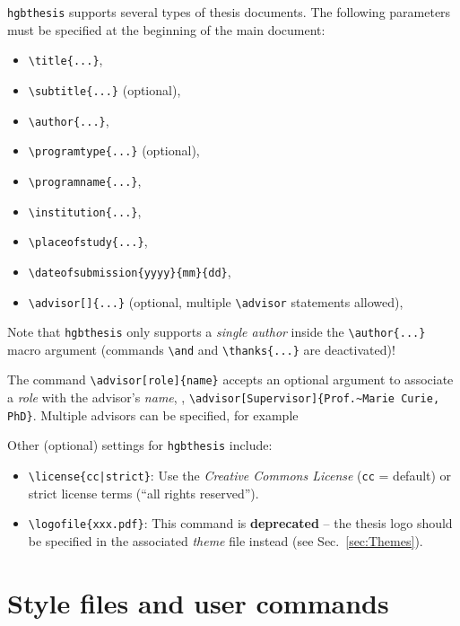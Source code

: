 \documentclass[english]{hgbarticle}
\begin{document}
\texttt{hgbthesis} supports several types of thesis documents. The following
parameters must be specified at the beginning of the main document:
%
\begin{itemize}
    \item \verb!\title{...}!,
    \item \verb!\subtitle{...}! (optional),
    \item \verb!\author{...}!,
    \item \verb!\programtype{...}! (optional), 
    \item \verb!\programname{...}!,
    \item \verb!\institution{...}!,
    \item \verb!\placeofstudy{...}!,
    \item \verb!\dateofsubmission{yyyy}{mm}{dd}!,
    \item \verb!\advisor[]{...}! (optional, multiple \verb!\advisor! statements allowed),
\end{itemize}
%
Note that \texttt{hgbthesis} only supports a \emph{single author} inside the
\verb!\author{...}! macro argument (commands \verb!\and! and
\verb!\thanks{...}! are deactivated)!

The command \verb!\advisor[role]{name}! accepts an optional argument to associate a \emph{role} 
with the advisor's \emph{name}, \eg, \verb!\advisor[Supervisor]{Prof.~Marie Curie, PhD}!.
Multiple advisors can be specified, for example
%
\begin{LaTeXCode}[numbers=none]
\end{LaTeXCode}

\noindent
Other (optional) settings for \texttt{hgbthesis} include:
\begin{itemize}
    \item \verb!\license{cc|strict}!:
    Use the \emph{Creative Commons License} (\texttt{cc} = default) or strict license terms
      (``all rights reserved'').
    \item \verb!\logofile{xxx.pdf}!:
		This command is \textbf{deprecated} -- the thesis logo 
		should be specified in the associated \emph{theme} file instead (see Sec.~\ref{sec:Themes}).
\end{itemize}

\section{Style files and user commands}
\end{document}
